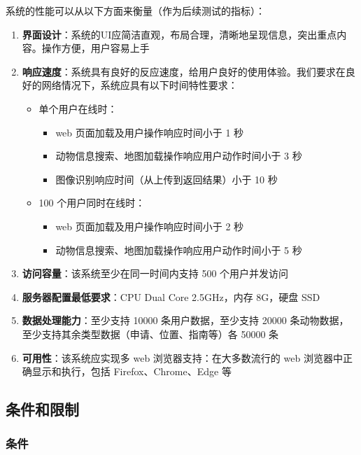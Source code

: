\documentclass[12pt,a4paper,UTF8]{article}
\begin{document}
系统的性能可以从以下方面来衡量（作为后续测试的指标）：
\begin{enumerate}
  \item \textbf{界面设计}：系统的UI应简洁直观，布局合理，清晰地呈现信息，突出重点内容。操作方便，用户容易上手
  \item \textbf{响应速度}：系统具有良好的反应速度，给用户良好的使用体验。我们要求在良好的网络情况下，系统应具有以下时间特性要求：
  \begin{itemize}
      \item 单个用户在线时：
      \begin{itemize}
          \item web 页面加载及用户操作响应时间小于 1 秒
          \item 动物信息搜索、地图加载操作响应用户动作时间小于 3 秒
          \item 图像识别响应时间（从上传到返回结果）小于 10 秒
      \end{itemize}
      \item 100 个用户同时在线时：
      \begin{itemize}
          \item web 页面加载及用户操作响应时间小于 2 秒
          \item 动物信息搜索、地图加载操作响应用户动作时间小于 5 秒
      \end{itemize}
  \end{itemize}
  \item \textbf{访问容量}：该系统至少在同一时间内支持 500 个用户并发访问
  \item \textbf{服务器配置最低要求}：CPU Dual Core 2.5GHz，内存 8G，硬盘 SSD
  \item \textbf{数据处理能力}：至少支持 10000 条用户数据，至少支持 20000 条动物数据，至少支持其余类型数据（申请、位置、指南等）各 50000 条
  \item \textbf{可用性}：该系统应实现多 web 浏览器支持：在大多数流行的 web 浏览器中正确显示和执行，包括 Firefox、Chrome、Edge 等
\end{enumerate}

\subsection{条件和限制}

\subsubsection{条件}
\end{document}
